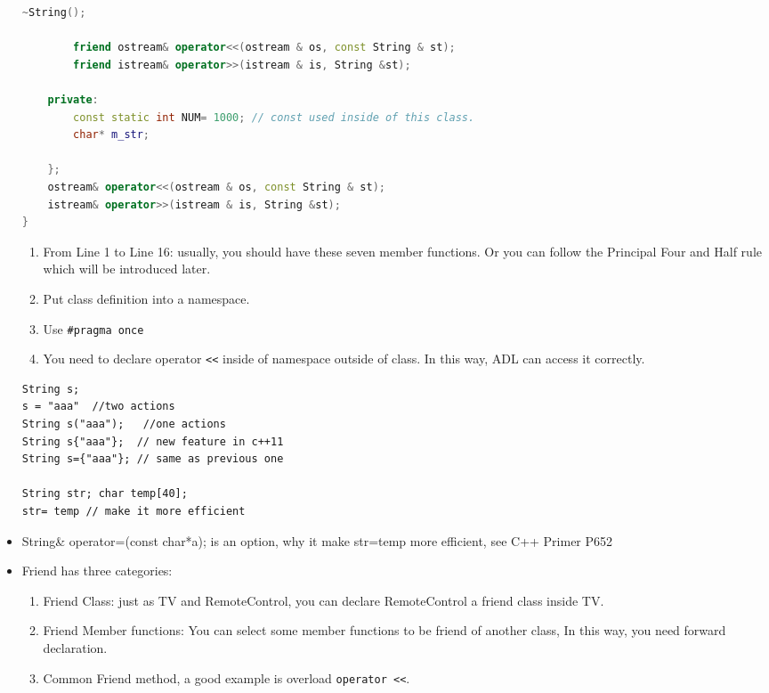 \documentclass[a4paper,11pt,twoside]{book}
\begin{document}
\begin{itemize}
\begin{lstlisting}[frame=single, language=c++]
		~String();  
		
		friend ostream& operator<<(ostream & os, const String & st);
		friend istream& operator>>(istream & is, String &st);
		
	private:
		const static int NUM= 1000; // const used inside of this class.
		char* m_str;
		
	};
	ostream& operator<<(ostream & os, const String & st);
	istream& operator>>(istream & is, String &st);
}
\end{lstlisting}
	
	\begin{enumerate}
		\item From Line 1 to Line 16: usually, you should have these seven member functions. Or you can follow the Principal Four and Half rule which will be introduced later. 
		\item Put class definition into a namespace.
		\item Use \texttt{\#pragma once}
		\item You need to declare operator \verb=<<= inside of namespace outside of class. In this way, ADL can access it correctly.
	\end{enumerate}
	
	
\begin{lstlisting}[numbers=none]
String s;
s = "aaa"  //two actions
String s("aaa");   //one actions
String s{"aaa"};  // new feature in c++11
String s={"aaa"}; // same as previous one
	
String str; char temp[40];
str= temp // make it more efficient
\end{lstlisting}
	
	\item String\& operator=(const char*a); is an option, why it make str=temp more efficient, see C++ Primer P652
	
	\item  Friend has three categories:
	\begin{enumerate}
		\item Friend Class: just as TV and RemoteControl, you can declare RemoteControl a friend class inside TV.
		
		\item Friend Member functions: You can select some member functions to be friend of another class, In this way, you need forward declaration.  
		
		\item Common Friend method, a good example is overload \verb=operator <<=. 
	\end{enumerate}
	

\end{itemize}
\end{document}
